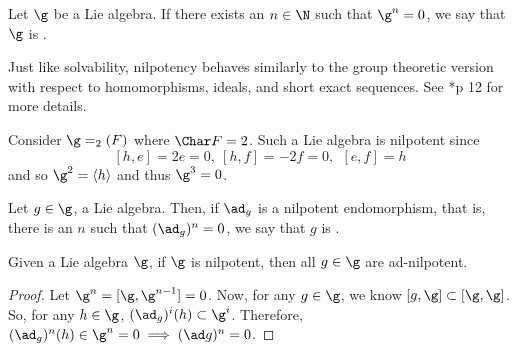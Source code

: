 \documentclass[11pt,leqno,oneside]{amsart}
\numberwithin{thm}{section}
\begin{document}
\begin{defn}
  Let \(\g\) be a Lie algebra. If there exists an \(n \in \N\) such
  that \(\g^n = 0\), we say that \(\g\) is .
\end{defn}
Just like solvability, nilpotency behaves similarly to the group
theoretic version with respect to homomorphisms, ideals, and short
exact sequences. See \cite{humph}*{p 12} for more details.
\begin{example}
  Consider \(\g = \sl_2(F)\) where \(\Char F = 2\). Such a Lie algebra
  is nilpotent since \[
    [h,e] = 2e = 0, \ [h,f] = -2f = 0, \ \ [e,f] = h
  \]
  and so \(\g^2 = \langle h \rangle\) and thus \(\g^3 = 0\).
\end{example}
\begin{defn}
  Let \(g \in \g\), a Lie algebra. Then, if \(\ad_g\) is a nilpotent
  endomorphism, that is, there is an \(n\) such that \((\ad_g)^n =
  0\), we say that \(g\) is . 
\end{defn}
\begin{prop}
  Given a Lie algebra \(\g\), if \(\g\) is nilpotent,
  then all \(g \in \g\) are ad-nilpotent.
\end{prop}
\begin{proof}
  Let \(\g^n = [\g, \g^{n-1}] = 0\). Now, for any \(g \in \g\), we
  know \([g,\g] \subset [\g,\g]\). So, for any \(h \in \g\),
  \((\ad_g)^i(h) \subset \g^i\). Therefore, \((\ad_g)^n(h) \in \g^n = 0
  \implies (\ad g)^n = 0\). 
\end{proof}
\end{document}
